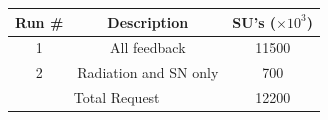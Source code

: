 \documentclass[11pt]{article}
\begin{document}



\begin{center}
\begin{tabular}{|c|c|c|}

\hline 
Run \# & %
             Description & SU's ($\times 10^3$) \\
\hline 
1 & %
       All feedback & 11500 \\
\hline 
2 & %
     Radiation and SN only & 700 \\
\hline 
\hline
\multicolumn{2}{|c|}{Total Request} & 12200 \\

\hline
\end{tabular}
\end{center}
\end{document}
